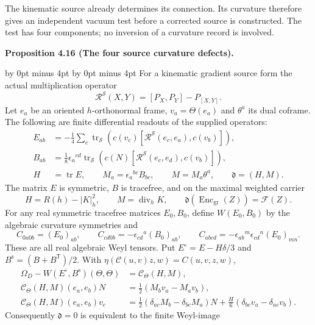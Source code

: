 \documentclass[
  english,
  11pt,
  reqno]{amsart}
\makeatletter
\newcommand{\pandocstatementheading}[1]{%
  \par\if@nobreak\else
    \addpenalty{\@beginparpenalty}%
    \addvspace{.5\baselineskip plus .2\baselineskip minus .2\baselineskip}%
  \fi
  {\normalfont\bfseries #1\par}%
  \nobreak\@afterindenttrue\@afterheading
}
\makeatother
\begin{document}
The kinematic source already determines its connection. Its curvature
therefore gives an independent vacuum test before a corrected source is
constructed. The test has four components; no inversion of a curvature
record is involved.

\pandocstatementheading{\leavevmode{}\label{prop:online-four-source-curvature-defects}Proposition 4.16 (The four source curvature defects).}

\begingroup
\advance\belowdisplayskip by 0pt minus 4pt
\advance\belowdisplayshortskip by 0pt minus 4pt
For a kinematic gradient source form the actual multiplication operator
\[
\mathcal R^{\mathscr S}(X,Y)=[P_X,P_Y]-P_{[X,Y]}.
\]\endgroup{} Let \(e_a\) be an oriented \(h\)-orthonormal frame,
\(v_a=\Theta(e_a)\) and \(\theta^a\) its dual coframe. The following are
finite differential readouts of the supplied operators:%
 \[
\begin{aligned}
E_{ab}
&=-\frac14\sum_c\operatorname{tr}_{\mathscr S}
\left(c(v_c)[\mathcal R^{\mathscr S}(e_c,e_a),c(v_b)]\right),\\
B_{ab}
&=\frac18\epsilon_a{}^{cd}\operatorname{tr}_{\mathscr S}
\left(c(N)[\mathcal R^{\mathscr S}(e_c,e_d),c(v_b)]\right),\\
H&=\operatorname{tr}E,
\qquad M_a=\epsilon_a{}^{bc}B_{bc},
\qquad M=M_a\theta^a,
\qquad\mathfrak d=(H,M).
\end{aligned}
\] The matrix \(E\) is symmetric, \(B\) is tracefree, and on the maximal
weighted carrier%
 \[
H=R(h)-|K|_h^2,\qquad
M=\operatorname{div}_hK,\qquad
\mathfrak d(\operatorname{Enc}_{\mathrm{gr}}(Z))=\mathcal F(Z).
\] For any real symmetric tracefree matrices \(E_0,B_0\), define
\(W(E_0,B_0)\) by the algebraic curvature symmetries and%
 \[
C_{0a0b}=(E_0)_{ab},\qquad
C_{cd0b}=-\epsilon_{cd}{}^a(B_0)_{ab},\qquad
C_{abcd}=-\epsilon_{ab}{}^m\epsilon_{cd}{}^n(E_0)_{mn}.
\] These are all real algebraic Weyl tensors. Put
\(E^\circ=E-H\delta/3\) and \(B^{\mathrm s}=(B+B^{\mathsf T})/2\). With
\(\eta(\mathcal C(u,v)z,w)=C(u,v,z,w)\),%
 \[
\begin{aligned}
\Omega_D-W(E^\circ,B^{\mathrm s})(\Theta,\Theta)
&=\mathcal C_\Theta(H,M),\\
\mathcal C_\Theta(H,M)(e_a,e_b)N
&=\frac12(M_bv_a-M_av_b),\\
\mathcal C_\Theta(H,M)(e_a,e_b)v_c
&=\frac12(\delta_{ac}M_b-\delta_{bc}M_a)N
+\frac H6(\delta_{bc}v_a-\delta_{ac}v_b).
\end{aligned}
\] Consequently \(\mathfrak d=0\) is equivalent to the finite Weyl-image
\end{document}
